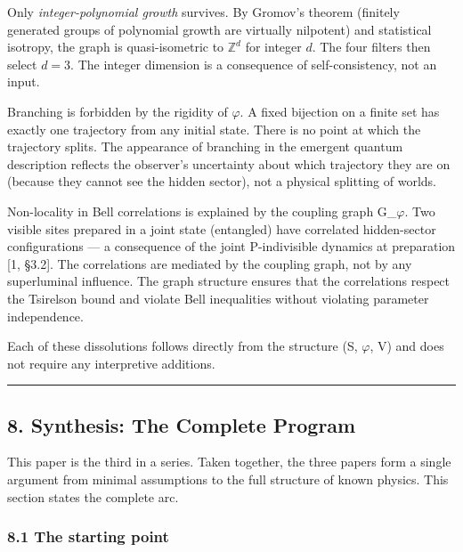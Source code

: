 \documentclass[
  11pt,
]{article}
\begin{document}
Only \emph{integer-polynomial growth} survives. By Gromov's theorem
(finitely generated groups of polynomial growth are virtually nilpotent)
and statistical isotropy, the graph is quasi-isometric to
\(\mathbb{Z}^d\) for integer \(d\). The four filters then select
\(d = 3\). The integer dimension is a consequence of self-consistency,
not an input.

Branching is forbidden by the rigidity of \ensuremath{\varphi}. A fixed bijection on a
finite set has exactly one trajectory from any initial state. There is
no point at which the trajectory splits. The appearance of branching in
the emergent quantum description reflects the observer's uncertainty
about which trajectory they are on (because they cannot see the hidden
sector), not a physical splitting of worlds.

Non-locality in Bell correlations is explained by the coupling graph
G\_\ensuremath{\varphi}. Two visible sites prepared in a joint state (entangled) have
correlated hidden-sector configurations --- a consequence of the joint
P-indivisible dynamics at preparation {[}1, §3.2{]}. The correlations
are mediated by the coupling graph, not by any superluminal influence.
The graph structure ensures that the correlations respect the Tsirelson
bound and violate Bell inequalities without violating parameter
independence.

Each of these dissolutions follows directly from the structure (S, \ensuremath{\varphi}, V)
and does not require any interpretive additions.

\begin{center}\rule{0.5\linewidth}{0.5pt}\end{center}

\hypertarget{synthesis-the-complete-program}{%
\subsection{8. Synthesis: The Complete
Program}\label{synthesis-the-complete-program}}

This paper is the third in a series. Taken together, the three papers
form a single argument from minimal assumptions to the full structure of
known physics. This section states the complete arc.

\hypertarget{the-starting-point}{%
\subsubsection{8.1 The starting point}\label{the-starting-point}}
\end{document}
